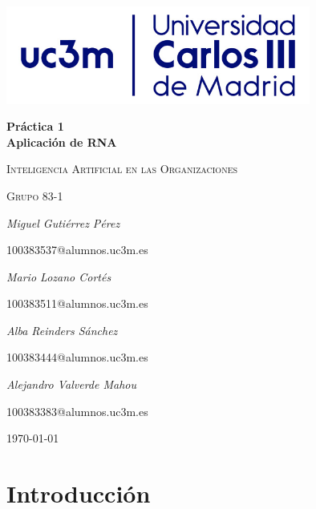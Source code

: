 \documentclass[12pt,a4paper, xcolor=table]{article}
\begin{document}
\setlength{\parindent}{0pt}
\begin{titlepage}
        \centering
        \includegraphics[width=0.75\textwidth]{img/logo_uc3m.jpg}\par\vspace{3cm}
        {\huge\bfseries Práctica 1 \\ Aplicación de RNA\par}
        \vspace{0.5cm}
        {\scshape\Large Inteligencia Artificial en las Organizaciones\par}
        \vspace{1.5cm}
        {\scshape\Large Grupo 83-1\par}
        \vspace{1.5cm}
        {\Large\itshape Miguel Gutiérrez Pérez\par}
        {\Large 100383537@alumnos.uc3m.es \par}
        \vspace{1cm}
        {\Large\itshape Mario Lozano Cortés\par}
        {\Large 100383511@alumnos.uc3m.es\par}
        \vspace{1cm}
        {\Large\itshape Alba Reinders Sánchez\par}
        {\Large 100383444@alumnos.uc3m.es\par}
        \vspace{1cm}
        {\Large\itshape Alejandro Valverde Mahou\par}
        {\Large 100383383@alumnos.uc3m.es\par}
        \vfill

        {\large \today\par}
\end{titlepage}

\tableofcontents

\newpage

\section{Introducción}
\end{document}
